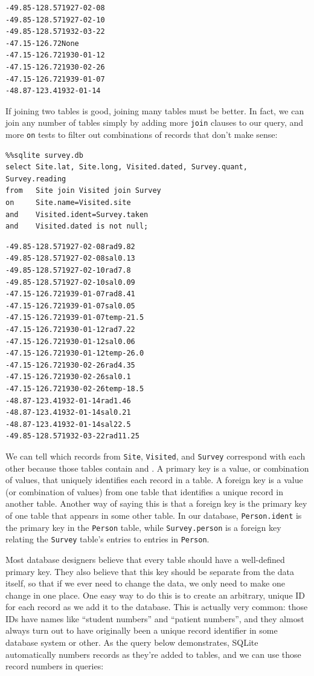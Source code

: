 \documentclass{book}
\begin{document}
\begin{verbatim}
-49.85-128.571927-02-08
-49.85-128.571927-02-10
-49.85-128.571932-03-22
-47.15-126.72None
-47.15-126.721930-01-12
-47.15-126.721930-02-26
-47.15-126.721939-01-07
-48.87-123.41932-01-14
\end{verbatim}

If joining two tables is good, joining many tables must be better. In
fact, we can join any number of tables simply by adding more
\texttt{join} clauses to our query, and more \texttt{on} tests to filter
out combinations of records that don't make sense:

\begin{verbatim}
%%sqlite survey.db
select Site.lat, Site.long, Visited.dated, Survey.quant, Survey.reading
from   Site join Visited join Survey
on     Site.name=Visited.site
and    Visited.ident=Survey.taken
and    Visited.dated is not null;
\end{verbatim}

\begin{verbatim}
-49.85-128.571927-02-08rad9.82
-49.85-128.571927-02-08sal0.13
-49.85-128.571927-02-10rad7.8
-49.85-128.571927-02-10sal0.09
-47.15-126.721939-01-07rad8.41
-47.15-126.721939-01-07sal0.05
-47.15-126.721939-01-07temp-21.5
-47.15-126.721930-01-12rad7.22
-47.15-126.721930-01-12sal0.06
-47.15-126.721930-01-12temp-26.0
-47.15-126.721930-02-26rad4.35
-47.15-126.721930-02-26sal0.1
-47.15-126.721930-02-26temp-18.5
-48.87-123.41932-01-14rad1.46
-48.87-123.41932-01-14sal0.21
-48.87-123.41932-01-14sal22.5
-49.85-128.571932-03-22rad11.25
\end{verbatim}

We can tell which records from \texttt{Site}, \texttt{Visited}, and
\texttt{Survey} correspond with each other because those tables contain
 and
. A primary key is a value, or
combination of values, that uniquely identifies each record in a table.
A foreign key is a value (or combination of values) from one table that
identifies a unique record in another table. Another way of saying this
is that a foreign key is the primary key of one table that appears in
some other table. In our database, \texttt{Person.ident} is the primary
key in the \texttt{Person} table, while \texttt{Survey.person} is a
foreign key relating the \texttt{Survey} table's entries to entries in
\texttt{Person}.

Most database designers believe that every table should have a
well-defined primary key. They also believe that this key should be
separate from the data itself, so that if we ever need to change the
data, we only need to make one change in one place. One easy way to do
this is to create an arbitrary, unique ID for each record as we add it
to the database. This is actually very common: those IDs have names like
``student numbers'' and ``patient numbers'', and they almost always turn
out to have originally been a unique record identifier in some database
system or other. As the query below demonstrates, SQLite automatically
numbers records as they're added to tables, and we can use those record
numbers in queries:
\end{document}
